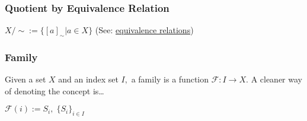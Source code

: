 \subsubsection{Quotient by Equivalence Relation}\label{equivalencequotient}
$X / \sim := \{[a]_{\sim} | a \in X \}$ (See: \hyperref[equivalencerelation]{equivalence relations})

\subsubsection{Family}\label{family}
Given a set $X$ and an index set $I,$ a family is a function $\mathcal{F} : I \rightarrow X.$ A cleaner way of denoting the concept is\dots \newline

$\mathcal{F}(i) := S_i, \; \{S_i\}_{i \in I}$